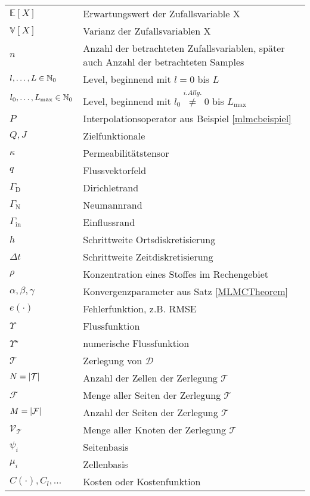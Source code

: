 \begin{longtable}[c]{ p{} p{}}
	$ \mathbb{E}[X] $ & Erwartungswert der Zufallsvariable X \\
	$ \mathbb{V}[X] $ & Varianz der Zufallsvariablen X \\
	$ n $ & Anzahl der betrachteten Zufallsvariablen, später auch Anzahl der betrachteten Samples \\
	$ l,\dots,L \in \mathbb{N}_0$ & Level, beginnend mit $ l=0 $ bis $ L $ \\
	$ l_0, \dots , L_{\text{max}} \in \mathbb{N}_0 $ & Level, beginnend mit $ l_0 \stackrel{i.Allg.}{\not =} 0 $ bis $ L_{\text{max}} $  \\
	$ P $ & Interpolationsoperator aus Beispiel \ref{mlmcbeispiel} \\
	$ Q,J $ & Zielfunktionale \\
	$ \kappa $ & Permeabilitätstensor \\
	$ q $ & Flussvektorfeld \\
	$ \Gamma_{\text{D}} $ & Dirichletrand \\
	$ \Gamma_{\text{N}} $ & Neumannrand \\
	$ \Gamma_{\text{in}} $ & Einflussrand \\
	$ h $ & Schrittweite Ortsdiskretisierung \\
	$ \Delta t $ & Schrittweite Zeitdiskretisierung \\
	$ \rho $ & Konzentration eines Stoffes im Rechengebiet \\
	$ \alpha,\beta,\gamma $ & Konvergenzparameter aus Satz \ref{MLMCTheorem} \\
	$ e(\cdot) $ & Fehlerfunktion, z.B. RMSE \\
	$ \Upsilon $ & Flussfunktion \\
	$ \Upsilon^{\star} $ & numerische Flussfunktion \\
	$ \mathcal{T} $ & Zerlegung von $ \mathcal{D} $ \\
	$ N= | \mathcal{T} | $ & Anzahl der Zellen der Zerlegung $ \mathcal{T} $\\
	$ \mathcal{F} $ & Menge aller Seiten der Zerlegung $ \mathcal{T} $ \\
	$ M = | \mathcal{F} | $ & Anzahl der Seiten der Zerlegung $ \mathcal{T} $ \\
	$ \mathcal{V}_{\mathcal{T}} $ & Menge aller Knoten der Zerlegung $ \mathcal{T} $\\
	$ {\psi_i} $ & Seitenbasis \\
	$ {\mu_i} $ & Zellenbasis \\
	$ C(\cdot) , C_l , \dots $ & Kosten oder Kostenfunktion \\

\end{longtable}
